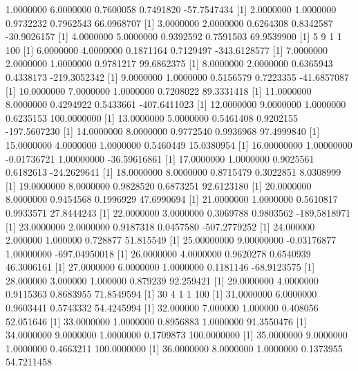\documentclass{article}
\begin{document}
\begin{Schunk}
\begin{Soutput}
[1]   1.0000000   6.0000000   0.7600058   0.7491820 -57.7547434
[1]  2.0000000  1.0000000  0.9732232  0.7962543 66.0968707
[1]   3.0000000   2.0000000   0.6264308   0.8342587 -30.9026157
[1]  4.0000000  5.0000000  0.9392592  0.7591503 69.9539900
[1]   5   9   1   1 100
[1]    6.0000000    4.0000000    0.1871164    0.7129497 -343.6128577
[1]  7.0000000  2.0000000  1.0000000  0.9781217 99.6862375
[1]    8.0000000    2.0000000    0.6365943    0.4338173 -219.3052342
[1]   9.0000000   1.0000000   0.5156579   0.7223355 -41.6857087
[1] 10.0000000  7.0000000  1.0000000  0.7208022 89.3331418
[1]   11.0000000    8.0000000    0.4294922    0.5433661 -407.6411023
[1]  12.0000000   9.0000000   1.0000000   0.6235153 100.0000000
[1]   13.0000000    5.0000000    0.5461408    0.9202155 -197.5607230
[1] 14.0000000  8.0000000  0.9772540  0.9936968 97.4999840
[1] 15.0000000  4.0000000  1.0000000  0.5460449 15.0380954
[1]  16.00000000   1.00000000  -0.01736721   1.00000000 -36.59616861
[1]  17.0000000   1.0000000   0.9025561   0.6182613 -24.2629641
[1] 18.0000000  8.0000000  0.8715479  0.3022851  8.0308999
[1] 19.0000000  8.0000000  0.9828520  0.6873251 92.6123180
[1] 20.0000000  8.0000000  0.9454568  0.1996929 47.6990694
[1] 21.0000000  1.0000000  0.5610817  0.9933571 27.8444243
[1]   22.0000000    3.0000000    0.3069788    0.9803562 -189.5818971
[1]   23.0000000    2.0000000    0.9187318    0.0457580 -507.2779252
[1] 24.000000  2.000000  1.000000  0.728877 51.815549
[1]   25.00000000    9.00000000   -0.03176877    1.00000000 -697.04950018
[1] 26.0000000  4.0000000  0.9620278  0.6540939 46.3006161
[1]  27.0000000   6.0000000   1.0000000   0.1181146 -68.9123575
[1] 28.000000  3.000000  1.000000  0.879239 92.259421
[1] 29.0000000  4.0000000  0.9115363  0.8683955 71.8549594
[1]  30   4   1   1 100
[1] 31.0000000  6.0000000  0.9603441  0.5743332 54.4245994
[1] 32.000000  7.000000  1.000000  0.408056 52.051646
[1] 33.0000000  1.0000000  0.8956883  1.0000000 91.3550476
[1]  34.0000000   9.0000000   1.0000000   0.1709873 100.0000000
[1]  35.0000000   9.0000000   1.0000000   0.4663211 100.0000000
[1] 36.0000000  8.0000000  1.0000000  0.1373955 54.7211458

\end{Soutput}
\end{Schunk}
\end{document}
